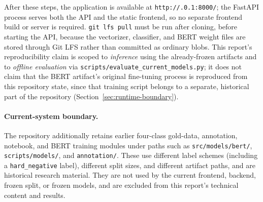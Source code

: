 After these steps, the application is available at \texttt{http:/\pbrk /.0.1:8000/\pbrk }; the FastAPI process serves both the API and the static frontend, so no separate frontend build or server is required. \texttt{git lfs pull} must be run after cloning, before starting the API, because the vectorizer, classifier, and BERT weight files are stored through Git LFS rather than committed as ordinary blobs. This report's reproducibility claim is scoped to \emph{inference} using the already-frozen artifacts and to \emph{offline evaluation} via \texttt{scripts/\pbrk evaluate\_\pbrk current\_\pbrk models.py}; it does not claim that the BERT artifact's original fine-tuning process is reproduced from this repository state, since that training script belongs to a separate, historical part of the repository (Section~\ref{sec:runtime-boundary}).

\label{sec:runtime-boundary}
\paragraph{Current-system boundary.} The repository additionally retains earlier four-class gold-data, annotation, notebook, and BERT training modules under paths such as \texttt{src/\pbrk models/\pbrk bert/\pbrk }, \texttt{scripts/\pbrk models/\pbrk }, and \texttt{annotation/\pbrk }. These use different label schemes (including a \texttt{hard\_negative} label), different split sizes, and different artifact paths, and are historical research material. They are not used by the current frontend, backend, frozen split, or frozen models, and are excluded from this report's technical content and results.

